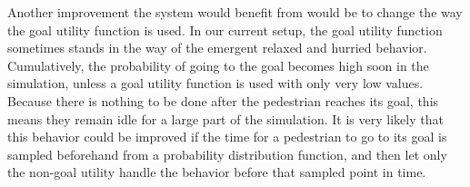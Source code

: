 \documentclass[11pt, a4paper]{book}
\begin{document}
Another improvement the system would benefit from would be to change the way the goal utility function is used. In our current setup, the goal utility function sometimes stands in the way of the emergent relaxed and hurried behavior. Cumulatively, the probability of going to the goal becomes high soon in the simulation, unless a goal utility function is used with only very low values. Because there is nothing to be done after the pedestrian reaches its goal, this means they remain idle for a large part of the simulation. It is very likely that this behavior could be improved if the time for a pedestrian to go to its goal is sampled beforehand from a probability distribution function, and then let only the non-goal utility handle the behavior before that sampled point in time.

\appendix
\end{document}
